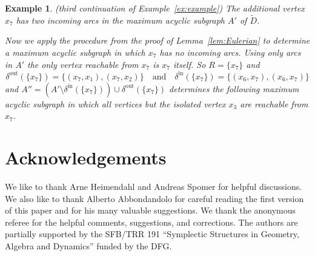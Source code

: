 \documentclass{amsart}
\newtheorem{example}[defin]{Example}
\newcommand{\deltain}{\delta^{\mathrm{in}}}
\newcommand{\deltaout}{\delta^{\mathrm{out}}}
\begin{document}
\begin{example} (third continuation of Example~\ref{ex:example}) The
  additional vertex $x_7$ has two incoming arcs in the maximum acyclic
  subgraph $A'$ of $\tilde{D}$.
  
Now we apply the procedure from the proof of Lemma~\ref{lem:Eulerian}
to determine a maximum acyclic subgraph in which $x_7$ has no
incoming arcs. Using only arcs in $A'$ the
only vertex reachable from $x_7$ is $x_7$ itself. So $R =
  \{x_7\}$ and
\[
  \deltaout(\{x_7\}) = \{(x_7,x_1), (x_7, x_2)\} \quad \text{and} \quad \deltain(\{x_7\})
  = \{(x_6,x_7), (x_6,x_7)\}
\]
and $A'' = (A' \setminus \deltain(\{x_7\})) \cup \deltaout(\{x_7\})$
determines the following maximum acyclic subgraph in which all
vertices but the isolated vertex $x_3$ are reachable from $x_7$.
\begin{center}
\end{center}
\end{example}

%
%
%

\section*{Acknowledgements}

We like to thank Arne Heimendahl and Andreas Spomer for helpful
discussions. We also like to thank Alberto Abbondandolo for careful
reading the first version of this paper and for his many valuable
suggestions. We thank the anonymous referee for the helpful comments, 
suggestions, and corrections. The authors are partially supported by the SFB/TRR 191
``Symplectic Structures in Geometry, Algebra and Dynamics'' funded by
the DFG.
\end{document}
